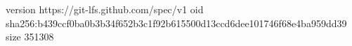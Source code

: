 version https://git-lfs.github.com/spec/v1
oid sha256:b439ccf0ba0b3b34f652b3c1f92b615500d13ccd6dee101746f68e4ba959dd39
size 351308
